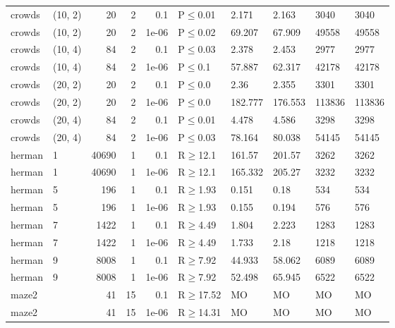 \begin{longtable}{llrrrlllll}
 crowds        & (10, 2)   &     	20 &   2 & 0.1   & P$\leq$0.01  & 2.171    & 2.163    & 3040   & 3040   \\
 crowds        & (10, 2)   &     	20 &   2 & 1e-06 & P$\leq$0.02  & 69.207   & 67.909   & 49558  & 49558  \\
 crowds        & (10, 4)   &     	84 &   2 & 0.1   & P$\leq$0.03  & 2.378    & 2.453    & 2977   & 2977   \\
 crowds        & (10, 4)   &     	84 &   2 & 1e-06 & P$\leq$0.1   & 57.887   & 62.317   & 42178  & 42178  \\
 crowds        & (20, 2)   &     	20 &   2 & 0.1   & P$\leq$0.0   & 2.36     & 2.355    & 3301   & 3301   \\
 crowds        & (20, 2)   &     	20 &   2 & 1e-06 & P$\leq$0.0   & 182.777  & 176.553  & 113836 & 113836 \\
 crowds        & (20, 4)   &     	84 &   2 & 0.1   & P$\leq$0.01  & 4.478    & 4.586    & 3298   & 3298   \\
 crowds        & (20, 4)   &     	84 &   2 & 1e-06 & P$\leq$0.03  & 78.164   & 80.038   & 54145  & 54145  \\
 herman        & 1         &  	40690 &   1 & 0.1   & R$\geq$12.1  & 161.57   & 201.57   & 3262   & 3262   \\
 herman        & 1         &  	40690 &   1 & 1e-06 & R$\geq$12.1  & 165.332  & 205.27   & 3232   & 3232   \\
 herman        & 5         &    	196 &   1 & 0.1   & R$\geq$1.93  & 0.151    & 0.18     & 534    & 534    \\
 herman        & 5         &    	196 &   1 & 1e-06 & R$\geq$1.93  & 0.155    & 0.194    & 576    & 576    \\
 herman        & 7         &   	1422 &   1 & 0.1   & R$\geq$4.49  & 1.804    & 2.223    & 1283   & 1283   \\
 herman        & 7         &   	1422 &   1 & 1e-06 & R$\geq$4.49  & 1.733    & 2.18     & 1218   & 1218   \\
 herman        & 9         &   	8008 &   1 & 0.1   & R$\geq$7.92  & 44.933   & 58.062   & 6089   & 6089   \\
 herman        & 9         &   	8008 &   1 & 1e-06 & R$\geq$7.92  & 52.498   & 65.945   & 6522   & 6522   \\
 maze2         &           &     	41 &  15 & 0.1   & R$\geq$17.52 & MO       & MO       & MO     & MO     \\
 maze2         &           &     	41 &  15 & 1e-06 & R$\geq$14.31 & MO       & MO       & MO     & MO     \\

\end{longtable}
